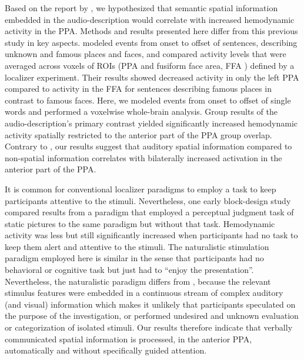 \documentclass[english]{article}
\begin{document}
Based on the report by \cite{aziz2008modulation}, we hypothesized that semantic
spatial information embedded in the audio-description would correlate with
increased hemodynamic activity in the PPA.
%
Methods and results presented here differ from this previous study in key
aspects.
\cite{aziz2008modulation} modeled events from onset to offset of sentences,
describing unknown and famous places and faces, and compared activity levels
that were averaged across voxels of ROIs (PPA and fusiform face area, FFA
\citep{kanwisher1997ffa}) defined by a localizer experiment.
Their results showed decreased activity in only the left PPA
compared to activity in the FFA for sentences describing famous places in contrast
to famous faces.
Here, we modeled events from onset to offset of single words and performed a
voxelwise whole-brain analysis.
Group results of the audio-description's primary contrast yielded significantly
increased hemodynamic activity spatially restricted to the anterior part of the
PPA group overlap.
Contrary to \cite{aziz2008modulation}, our results suggest that auditory
spatial information compared to non-spatial information correlates with
bilaterally increased activation in the anterior part of the PPA.

It is common for conventional localizer paradigms to employ a task to keep
participants attentive to the stimuli.
Nevertheless, one early block-design study \citep{epstein1998ppa} compared
results from a paradigm that employed a perceptual judgment task of static
pictures to the same paradigm but without that task.
Hemodynamic activity was less but still significantly increased when
participants had no task to keep them alert and attentive to the stimuli.
The naturalistic stimulation paradigm employed here is similar in the sense that
participants had no behavioral or cognitive task \cite[e.g., forming a mental
image of the stimuli;][]{ocraven2000mental} but just had to ``enjoy the
presentation''.
Nevertheless, the naturalistic paradigm differs from \cite{epstein1998ppa},
because the relevant stimulus features were embedded in a continuous stream of
complex auditory (and visual) information which makes it unlikely that
participants speculated on the purpose of the investigation, or performed
undesired and unknown evaluation or categorization of isolated stimuli.
Our results therefore indicate that verbally communicated spatial information is
processed, in the anterior PPA, automatically and without specifically guided
attention.
\end{document}
